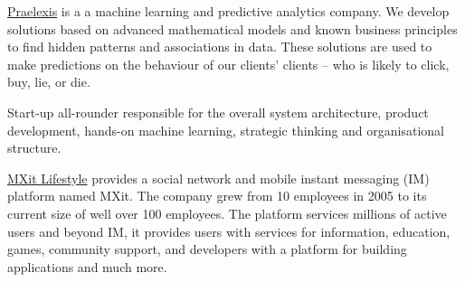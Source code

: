 \documentclass[10pt,a4paper,final]{columncv}
\begin{document}
\pagebreak


\noindent \href{http://www.praelexis.com/}{Praelexis} is a a machine learning and predictive 
analytics company. We develop solutions based on advanced mathematical models and known 
business principles to find hidden patterns and associations in data. These solutions are used 
to make predictions on the behaviour of our clients' clients -- who is likely to click, buy, lie, or die.
\begin{cvenv}
         {Start-up all-rounder responsible for the overall system architecture, product 
         development, hands-on machine learning, strategic thinking and organisational
	 structure.}
\end{cvenv}

\noindent \href{http://www.mxit.com/}{MXit Lifestyle} provides a social network and mobile 
          instant messaging (IM) platform named MXit. The 
          company grew from 10 employees in 2005 to its current size of well over 100 
          employees. The platform services millions of active users and beyond IM,
          it provides users with services for information, education, games, community 
          support, and developers with a platform for building applications and much more. 
\\[-3em]
\end{document}
